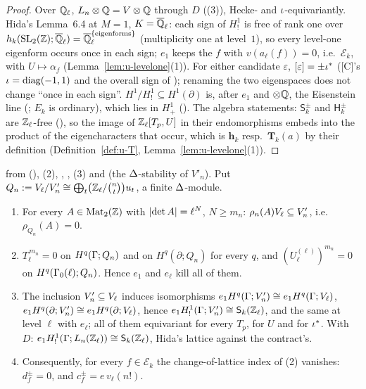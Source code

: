 \documentclass[11pt]{article}
\newcommand{\hcusp}{\mathbf{h}}                   %
\newcommand{\Tu}{\mathbf{T}}                      %
\newcommand{\Ek}{\mathcal{E}}                     %
\newcommand{\Qlb}{\overline{\Q}_\ell}
\newcommand{\Zl}{\Z_\ell}
\newcommand{\Ql}{\Q_\ell}
\begin{document}
\begin{proof}
Over $\Ql$, $L_n\otimes\mathbb{Q}=V\otimes\mathbb{Q}$ through $D$ ((3)), Hecke- and $\iota$-equivariantly. Hida's Lemma~6.4 at $M=1$, $K=\Qlb$: each sign of
$H^{1}_{!}$ is free of rank one over $h_{k}(\SL_2(\Z);\Qlb)=\Qlb^{\{\text{eigenforms}\}}$ (multiplicity one at level~$1$), so every level-one eigenform occurs once in each
sign; $e_1$ keeps the $f$ with $v(a_\ell(f))=0$, i.e.\ $\Ek_k$, with $U\mapsto\alpha_f$ (Lemma~\ref{lem:u-levelone}(1)). For either candidate $\varepsilon$, $[\varepsilon]=\pm\iota^{\ast}$ ([C]'s $\iota=\mathrm{diag}(-1,1)$
and the overall sign of ); renaming the two eigenspaces does not change ``once in each sign''. $H^{1}/H^{1}_{!}\subseteq H^{1}(\partial)$ is,
after $e_1$ and $\otimes\mathbb{Q}$, the Eisenstein line (; $E_k$ is ordinary), which lies in $H^{1}_{+}$ (). The algebra statements: $\mathsf S^{\pm}_k$
and $\mathsf H^{\pm}_k$ are $\Zl$-free (), so the image of $\Zl[T_p,U]$ in their endomorphisms embeds into the product of the eigencharacters
that occur, which is $\hcusp_k$ resp.\ $\Tu_k(a)$ by their definition (Definition~\ref{def:u-T}, Lemma~\ref{lem:u-levelone}(1)).
\end{proof}

\begin{lemma}\label{lem:u-latticeord}
\PROVED{} from  (), (2), , , (3) and
 (the $\Delta$-stability of $V'_n$). Put $Q_n:=\Vcoef_\ell/V'_n\cong\bigoplus_t\bigl(\Zl/\tbinom nt\bigr)u_t$, a finite $\Delta$-module.
\begin{enumerate}
\item For every $A\in\mathrm{Mat}_2(\mathbb{Z})$ with $\left| \det A \right|=\ell^{N}$, $N\ge m_n$: $\rho_n(A)V_\ell\subseteq V'_n$, i.e.\ $\rho_{Q_n}(A)=0$.
\item $T_\ell^{\,m_n}=0$ on $H^{q}(\Gamma;Q_n)$ and on $H^{q}(\partial;Q_n)$ for every $q$, and $(U^{(\ell)}_\ell)^{m_n}=0$ on $H^{q}(\Gamma_0(\ell);Q_n)$. Hence $e_1$ and $e_\ell$
  kill all of them.
\item The inclusion $V'_n\subseteq V_\ell$ induces isomorphisms $e_1H^{q}(\Gamma;V'_n)\cong e_1H^{q}(\Gamma;V_\ell)$, $e_1H^{q}(\partial;V'_n)\cong e_1H^{q}(\partial;V_\ell)$,
  hence $e_1H^{1}_{!}(\Ga;V'_n)\cong\mathsf S_k(\Zl)$, and the same at level $\ell$ with $e_\ell$; all of them equivariant for every $T_p$, for $U$ and for $\iota^{\ast}$. With
  $D$: $e_1H^{1}_{!}(\Ga;L_n(\Zl))\cong\mathsf S_k(\Zl)$, Hida's lattice against the contract's.
\item Consequently, for every $f\in\Ek_k$ the change-of-lattice index of (2) vanishes: $d^{\pm}_f=0$, and $c^{\pm}_f=e\,v_\ell(n!)$.
\end{enumerate}
\end{lemma}
\end{document}
